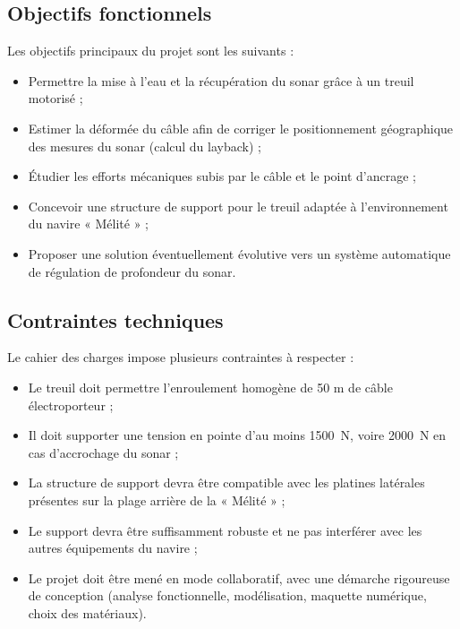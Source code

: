 \documentclass[12pt,a4paper]{article}
\begin{document}
\subsection{Objectifs fonctionnels}


Les objectifs principaux du projet sont les suivants :

\begin{itemize}

  \item Permettre la mise à l’eau et la récupération du sonar grâce à un treuil motorisé ;
  \item Estimer la déformée du câble afin de corriger le positionnement géographique des mesures du sonar
  (calcul du layback) ;
  \item Étudier les efforts mécaniques subis par le câble et le point d’ancrage ;
  \item Concevoir une structure de support pour le treuil adaptée à l’environnement du navire « Mélité » ;
  \item Proposer une solution éventuellement évolutive vers un système automatique de régulation de profondeur du sonar.

\end{itemize}


\subsection{Contraintes techniques}


Le cahier des charges impose plusieurs contraintes à respecter :

\begin{itemize}
  \item Le treuil doit permettre l’enroulement homogène de 50 m de câble électroporteur ;
  \item Il doit supporter une tension en pointe d’au moins 1500~N, voire 2000~N en cas d’accrochage du sonar ;
  \item La structure de support devra être compatible avec les platines latérales présentes sur la plage arrière de la
  « Mélité » ;
  \item Le support devra être suffisamment robuste et ne pas interférer avec les autres équipements du navire ;
  \item Le projet doit être mené en mode collaboratif, avec une démarche rigoureuse de conception
  (analyse fonctionnelle, modélisation, maquette numérique, choix des matériaux).

\end{itemize}
\end{document}
